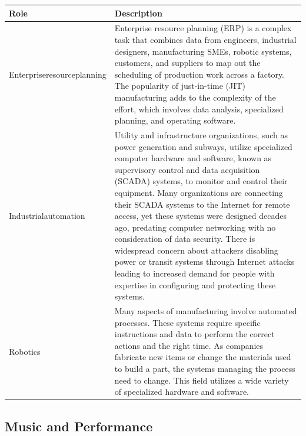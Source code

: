\begin{table}[H]
	\begin{center}
		\begin{tabular}{p{1in}|p{3.4in}} 
			\textbf{Role} & \textbf{Description}\\
			\hline
			Enterprise\linebreak resource\linebreak planning & Enterprise resource planning (ERP) is a complex task that combines data from engineers, industrial designers, manufacturing SMEs, robotic systems, customers, and suppliers to map out the scheduling of production work across a factory. The popularity of just-in-time (JIT) manufacturing adds to the complexity of the effort, which involves data analysis, specialized planning, and operating software.\\
			\hline
			Industrial\linebreak automation & Utility and infrastructure organizations, such as power generation and subways, utilize specialized computer hardware and software, known as supervisory control and data acquisition (SCADA) systems, to monitor and control their equipment. Many organizations are connecting their SCADA systems to the Internet for remote access, yet these systems were designed decades ago, predating computer networking with no consideration of data security. There is widespread concern about attackers disabling power or transit systems through Internet attacks leading to increased demand for people with expertise in configuring and protecting these systems.\\
			\hline
			Robotics & Many aspects of manufacturing involve automated processes. These systems require specific instructions and data to perform the correct actions and the right time. As companies fabricate new items or change the materials used to build a part, the systems managing the process need to change. This field utilizes a wide variety of specialized hardware and software.\\
			\hline
		\end{tabular}
	\end{center}
\end{table}

\subsection{Music and Performance}

